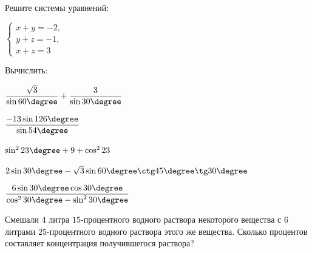 \begin{listofex}
	\item Решите системы уравнений:
	\begin{enumcols}[itemcolumns=3]
		\item {}
		\item {}
		\item \( \left\{
		\begin{array}{l}
			x+y=-2,\\
			y+z=-1,\\
			x+z=3
		\end{array}
		\right. \)
		\end{enumcols}
			\item Вычислить:
	\begin{enumcols}[itemcolumns=2]
		\item \( \dfrac{\sqrt{3}}{\sin60\degree}+\dfrac{3}{\sin30\degree} \)
		\item \( \dfrac{-13\sin126\degree}{\sin54\degree} \)
		\item \( \sin^223\degree+9+\cos^223 \)
		\item \( 2\sin30\degree-\sqrt{3}\sin60\degree\ctg45\degree\tg30\degree\)
		\item \( \dfrac{6\sin30\degree\cos30\degree}{\cos^230\degree-\sin^230\degree} \)
	\end{enumcols}
	\item {}
	\item {}
	\item {}
	\item {}
	\item {}
	\item Смешали \( 4 \) литра \( 15 \)-процентного водного раствора некоторого вещества с \( 6 \) литрами	\( 25 \)-процентного водного раствора этого же вещества. Сколько процентов составляет концентрация получившегося раствора?
	\item 
\end{listofex}
